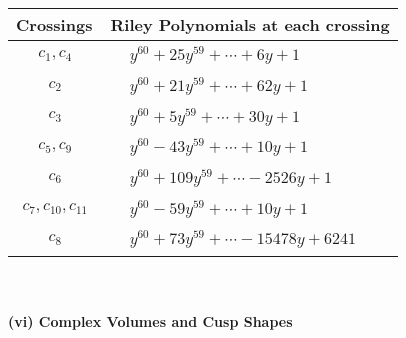 \documentclass[1p]{elsarticle_modified}
\theoremstyle{definition}
\begin{document}
\begin{tabular}{m{50pt}|m{274pt}}
Crossings & \hspace{64pt}Riley Polynomials at each crossing \\
\hline $$\begin{aligned}c_{1},c_{4}\end{aligned}$$&$\begin{aligned}
&y^{60}+25 y^{59}+\cdots+6 y+1
\end{aligned}$\\
\hline $$\begin{aligned}c_{2}\end{aligned}$$&$\begin{aligned}
&y^{60}+21 y^{59}+\cdots+62 y+1
\end{aligned}$\\
\hline $$\begin{aligned}c_{3}\end{aligned}$$&$\begin{aligned}
&y^{60}+5 y^{59}+\cdots+30 y+1
\end{aligned}$\\
\hline $$\begin{aligned}c_{5},c_{9}\end{aligned}$$&$\begin{aligned}
&y^{60}-43 y^{59}+\cdots+10 y+1
\end{aligned}$\\
\hline $$\begin{aligned}c_{6}\end{aligned}$$&$\begin{aligned}
&y^{60}+109 y^{59}+\cdots-2526 y+1
\end{aligned}$\\
\hline $$\begin{aligned}c_{7},c_{10},c_{11}\end{aligned}$$&$\begin{aligned}
&y^{60}-59 y^{59}+\cdots+10 y+1
\end{aligned}$\\
\hline $$\begin{aligned}c_{8}\end{aligned}$$&$\begin{aligned}
&y^{60}+73 y^{59}+\cdots-15478 y+6241
\end{aligned}$\\
\hline
\end{tabular}\\~\\
\newpage\flushleft \textbf{(vi) Complex Volumes and Cusp Shapes}
\end{document}
